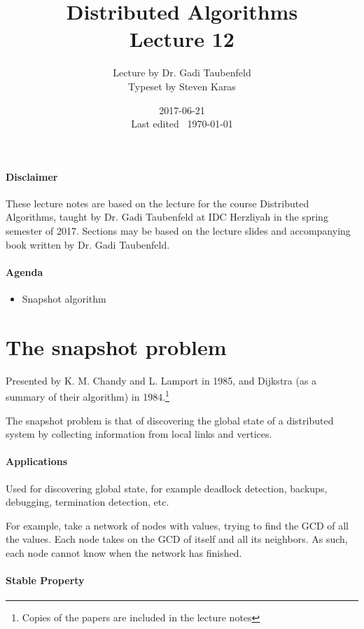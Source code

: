 \documentclass{idc_msc}
\title{Distributed Algorithms\\\large Lecture 12}
\date{2017-06-21 \\ Last edited \currenttime\ \today}
\author{Lecture by Dr. Gadi Taubenfeld\\Typeset by Steven Karas}
\begin{document}
\maketitle

\paragraph{Disclaimer}

These lecture notes are based on the lecture for the course Distributed Algorithms, taught by Dr. Gadi Taubenfeld at IDC Herzliyah in the spring semester of 2017.
Sections may be based on the lecture slides and accompanying book written by Dr. Gadi Taubenfeld.

\paragraph{Agenda}

\begin{itemize}
  \item Snapshot algorithm
\end{itemize}

\section{The snapshot problem}

Presented by K. M. Chandy and L. Lamport in 1985, and Dijkstra (as a summary of their algorithm) in 1984.\footnote{Copies of the papers are included in the lecture notes}

The snapshot problem is that of discovering the global state of a distributed system by collecting information from local links and vertices.

\paragraph{Applications}

Used for discovering global state, for example deadlock detection, backups, debugging, termination detection, etc.

For example, take a network of nodes with values, trying to find the GCD of all the values. Each node takes on the GCD of itself and all its neighbors. As such, each node cannot know when the network has finished.

\paragraph{Stable Property}
\end{document}
